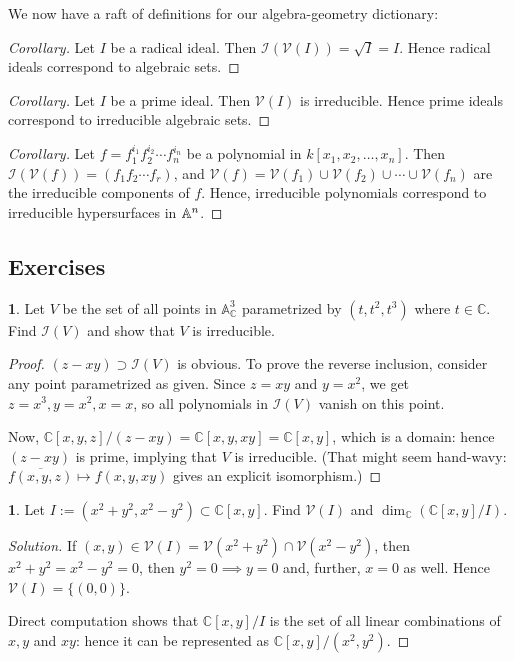 \documentclass{book}
\newcommand{\I}[1]{\mathcal{I}(#1)}
\newcommand{\V}[1]{\mathcal{V}(#1)}
\newcommand{\kn}{k[x_1,x_2,\ldots,x_n]}
\newcommand{\Af}{{\Bbb A}^n}
\newcommand{\C}{\mathbb C}
\theoremstyle{definition}
\theoremstyle{block}
\newtheorem{block*}[block]{}
\theoremstyle{thm}
\begin{document}
We now have a raft of definitions for our algebra-geometry
dictionary:
\begin{proof}[Corollary]
  Let $I$ be a radical ideal. Then $\I{\V I} = \sqrt I = I$. Hence radical
  ideals correspond to algebraic sets.
\end{proof}
\begin{proof}[Corollary]
  Let $I$ be a prime ideal. Then $\V I$ is irreducible. Hence prime ideals
  correspond to irreducible algebraic sets.
\end{proof}
\begin{proof}[Corollary]
  Let $f=f_1^{i_1}f_2^{i_2}\cdots f_n^{i_n}$ be a polynomial in $\kn$. Then
  $\I{\V f} = (f_1f_2\cdots f_r)$, and $\V f =
  \V{f_1}\cup\V{f_2}\cup\cdots\cup\V{f_n}$ are the irreducible components of
  $f$. Hence, irreducible polynomials correspond to irreducible hypersurfaces in
  $\Af$.
\end{proof}

\subsection{Exercises}
\begin{block*}
  Let $V$ be the set of all points in $\mathbb{A}^3_{\mathbb C}$ parametrized by
  $(t,t^2,t^3)$ where $t\in\mathbb C$. Find $\I V$ and show that $V$ is irreducible.
\end{block*}
\begin{proof}
  $(z-xy)\supset \I V$ is obvious. To prove the reverse inclusion, consider any
  point parametrized as given. Since $z=xy$ and $y=x^2$, we get
  $z=x^3,y=x^2,x=x$, so all polynomials in $\I V$ vanish on this point.\par
  Now, ${\mathbb C}[x,y,z]/(z-xy) = {\mathbb C}[x,y,xy] = {\mathbb C}[x,y]$,
  which is a domain: hence $(z-xy)$ is prime, implying that $V$ is irreducible. 
  (That might seem hand-wavy: $\overline{f(x,y,z)}\mapsto f(x,y,xy)$ gives an
  explicit isomorphism.)
\end{proof}

\begin{block*}
  Let $I:=(x^2+y^2,x^2-y^2)\subset\C[x,y]$. Find $\V I$ and $\dim_{\C}(\C[x,y]/I)$.
\end{block*}
\begin{proof}[Solution]
  If $(x,y)\in\V I=\V{x^2+y^2}\cap\V{x^2-y^2}$, then $x^2+y^2=x^2-y^2=0$, then
  $y^2=0\implies y=0$ and, further, $x=0$ as well. Hence $\V I = \{(0,0)\}$.\par 
  Direct computation shows that $\C[x,y]/I$ is the set of all linear
  combinations of $x,y$ and $xy$: hence it can be represented as
  $\C[x,y]/(x^2,y^2)$. 
\end{proof}
\end{document}
